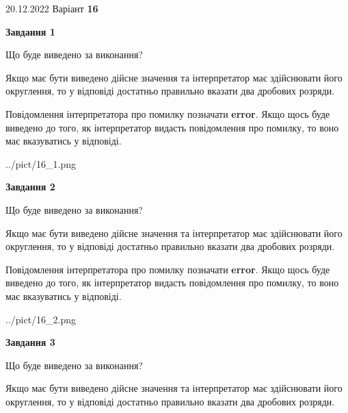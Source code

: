 \documentclass[12pt, ukrainian]{article}
\begin{document}
{20.12.2022 Варіант \No \textbf { 16 }\par}
{
\begin {Large}

{\begin {center}\textbf{Завдання 1}\end {center}}\par
Що буде виведено за виконання? \par

Якщо має бути виведено дійсне значення та інтерпретатор має здійснювати його округлення, 
то у відповіді достатньо правильно вказати два дробових розряди.

Повідомлення інтерпретатора про помилку позначати \textbf{error}.
Якщо щось буде виведено до того, як інтерпретатор видасть повідомлення про помилку, 
то воно має вказуватись у відповіді. \par

\begin{center}
	{../pict/16_1.png}
\end{center}
\newpage

{\begin {center}\textbf{Завдання 2}\end {center}}\par
Що буде виведено за виконання? \par

Якщо має бути виведено дійсне значення та інтерпретатор має здійснювати його округлення, 
то у відповіді достатньо правильно вказати два дробових розряди.

Повідомлення інтерпретатора про помилку позначати \textbf{error}.
Якщо щось буде виведено до того, як інтерпретатор видасть повідомлення про помилку, 
то воно має вказуватись у відповіді. \par

\begin{center}
	{../pict/16_2.png}
\end{center}
\newpage

{\begin {center}\textbf{Завдання 3}\end {center}}\par
Що буде виведено за виконання? \par

Якщо має бути виведено дійсне значення та інтерпретатор має здійснювати його округлення, 
то у відповіді достатньо правильно вказати два дробових розряди.


\end{Large}}
\end{document}
